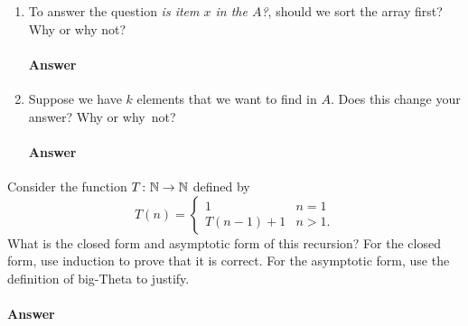 \documentclass{article}
\begin{document}
\begin{enumerate}
	\item To answer the question \emph{is item $x$ in the $A$?}, should we
	      sort the array first?  Why or why not?

	      \paragraph{Answer}
	      \todo{}

	\item Suppose we have $k$ elements that we want to find in $A$. Does this
	      change your answer? Why or why~not?

	      \paragraph{Answer}
	      \todo{}

\end{enumerate}

\collab{\todo{}}
Consider the function $T \colon {\mathbb N} \to {\mathbb N}$ defined by
\[T (n) = \begin{cases}
		1        & n=1  \\
		T(n-1)+1 & n>1.
	\end{cases}
\]
What is the closed form and asymptotic form of this recursion?  For the
closed form, use induction to prove that it is correct.  For the asymptotic
form, use the definition of big-Theta to justify.

\paragraph{Answer}
\todo{}


\collab{\todo{}}
\end{document}
